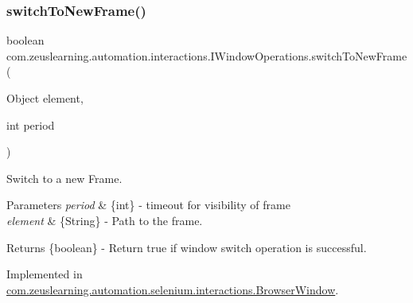 \hypertarget{interfacecom_1_1zeuslearning_1_1automation_1_1interactions_1_1IWindowOperations_a24e2a4aa538e35924e7195d058f30b9b}{}\label{interfacecom_1_1zeuslearning_1_1automation_1_1interactions_1_1IWindowOperations_a24e2a4aa538e35924e7195d058f30b9b} 
\subsubsection{\texorpdfstring{switch\+To\+New\+Frame()}{switchToNewFrame()}\hspace{0.1cm}{\footnotesize\ttfamily [2/2]}}
{\footnotesize\ttfamily boolean com.\+zeuslearning.\+automation.\+interactions.\+I\+Window\+Operations.\+switch\+To\+New\+Frame (\begin{DoxyParamCaption}\item[{Object}]{element,  }\item[{int}]{period }\end{DoxyParamCaption})}

Switch to a new Frame.


\begin{DoxyParams}{Parameters}
{\em period} & \{int\} -\/ timeout for visibility of frame \\
\hline
{\em element} & \{String\} -\/ Path to the frame. \\
\hline
\end{DoxyParams}
\begin{DoxyReturn}{Returns}
\{boolean\} -\/ Return {\ttfamily true} if window switch operation is successful. 
\end{DoxyReturn}


Implemented in \hyperlink{classcom_1_1zeuslearning_1_1automation_1_1selenium_1_1interactions_1_1BrowserWindow_ad9874267c9a73f226dc6a7863ae184a2}{com.\+zeuslearning.\+automation.\+selenium.\+interactions.\+Browser\+Window}.

\hypertarget{interfacecom_1_1zeuslearning_1_1automation_1_1interactions_1_1IWindowOperations_ab79086f48e864eb7a2dcf3b53d94dc2b}{}\label{interfacecom_1_1zeuslearning_1_1automation_1_1interactions_1_1IWindowOperations_ab79086f48e864eb7a2dcf3b53d94dc2b} 
